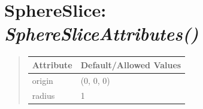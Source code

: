 \documentclass[letterpaper,10pt,english]{sphinxmanual}
\begin{document}
\section{\textbf{SphereSlice}: \emph{SphereSliceAttributes()}}
\label{attributes:sphereslice-spheresliceattributes}
\begin{DUlineblock}{0em}
\item[] 
\end{DUlineblock}
\begin{quote}

\begin{tabulary}{\linewidth}{|L|L|}
\hline

\textbf{Attribute}
 & 
\textbf{Default/Allowed Values}
\\
\hline
origin
 & 
(0, 0, 0)
\\
\hline
radius
 & 
1
\\
\hline\end{tabulary}

\end{quote}

\begin{DUlineblock}{0em}
\item[] 
\end{DUlineblock}

\begin{DUlineblock}{0em}
\item[] 
\end{DUlineblock}
\end{document}

